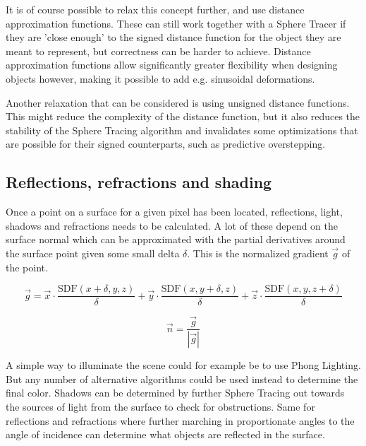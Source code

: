 			It is of course possible to relax this concept further, and use
			distance approximation functions. These can still work together 
			with a Sphere Tracer if they are 'close enough' to the signed 
			distance function for the object they are meant to represent, but
			correctness can be harder to achieve. Distance approximation 
			functions allow significantly greater flexibility when designing 
			objects however, making it possible to add e.g. sinusoidal 
			deformations\cite{Quilez, Keinert}.

			Another relaxation that can be considered is using unsigned 
			distance functions. This might reduce the complexity of the 
			distance function, but it also reduces the stability of the Sphere
			Tracing algorithm and invalidates some optimizations that are 
			possible for their signed counterparts, such as predictive 
			overstepping\cite{Korndorfer2014}.

		\subsection{Reflections, refractions and shading}

			Once a point on a surface for a given pixel has been located,
			reflections, light, shadows and refractions needs to be calculated.
			A lot of these depend on the surface normal which can be
			approximated with the partial derivatives around the surface point
			given some small delta $\delta$. This is the normalized gradient
			$\vec{g}$ of the point.

			$$\vec{g} = \vec{x}\cdot\frac{\text{SDF}(x+\delta, y, z)}{\delta} +
			\vec{y}\cdot\frac{\text{SDF}(x, y+\delta, z)}{\delta} +
			\vec{z}\cdot\frac{\text{SDF}(x, y, z+\delta)}{\delta} $$

			$$\vec{n} = \frac{\vec{g}}{|\vec{g}|} $$

			A simple way to illuminate the scene could for example be to use
			Phong Lighting\cite{Phong1975}. But any number of alternative
			algorithms could be used instead to determine the final color.
			Shadows can be determined by further Sphere Tracing out towards the
			sources of light from the surface to check for obstructions. Same 
			for reflections	and refractions where further marching in 
			proportionate angles to	the angle of incidence can determine what 
			objects are reflected in the surface.
